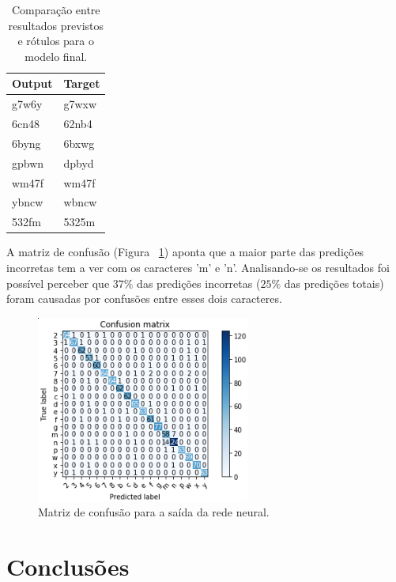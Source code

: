 \documentclass[11pt]{article}
\begin{document}
\begin{table}[H]
    {\centering
\begin{tabular}{@{}ll@{}}
\toprule
Output   & Target \\ \midrule
g7w6y &g7wxw \\
6cn48 &62nb4 \\
6byng &6bxwg \\
gpbwn &dpbyd \\
wm47f &wm47f \\
ybncw &wbncw \\
532fm &5325m \\ \bottomrule
\end{tabular}
    \caption{Comparação entre resultados previstos e rótulos para o modelo final.}
\label{tab:pred}
    \par}
\end{table}


A matriz de confusão (Figura ~\ref{fig:confusion}) aponta que a maior parte das predições incorretas tem a ver com os caracteres 'm' e 'n'. Analisando-se os resultados foi possível perceber que $37\%$ das predições incorretas ($25\%$ das predições totais) foram causadas por confusões entre esses dois caracteres.

  \begin{figure}[H]
        {\centering
        \includegraphics[width=70mm]{images/confusion.png}
        \caption{Matriz de confusão para a saída da rede neural.}
        \label{fig:confusion}\par}
  \end{figure}




\section{Conclus\~{o}es}
\end{document}
